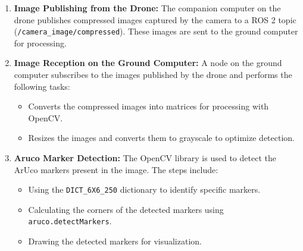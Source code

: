    \begin{enumerate}
        \item \textbf{Image Publishing from the Drone:} 
        The companion computer on the drone publishes compressed images captured by the camera to a ROS 2 topic (\texttt{/camera\_image/compressed}). These images are sent to the ground computer for processing.
    
        \item \textbf{Image Reception on the Ground Computer:} 
        A node on the ground computer subscribes to the images published by the drone and performs the following tasks:
        \begin{itemize}
            \item Converts the compressed images into matrices for processing with OpenCV.
            \item Resizes the images and converts them to grayscale to optimize detection.
        \end{itemize}
    
        \item \textbf{Aruco Marker Detection:} 
        The OpenCV library is used to detect the ArUco markers present in the image. The steps include:
        \begin{itemize}
            \item Using the \texttt{DICT\_6X6\_250} dictionary to identify specific markers.
            \item Calculating the corners of the detected markers using \texttt{aruco.detectMarkers}.
            \item Drawing the detected markers for visualization.
        \end{itemize}
        \begin{center}
            \begin{figure}[H]
                \centering
            \end{figure}
        \end{center}
    

\end{enumerate}
